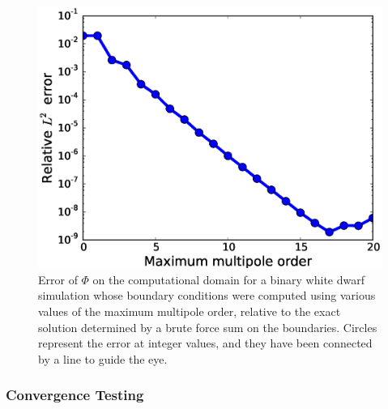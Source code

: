 \documentclass[12pt]{article}
\begin{document}
\begin{figure}[h!]
  \centering
  \includegraphics[scale=0.875]{plots/bc_comparison}
  \caption[Error in potential from multipole boundary conditions]
          {Error of $\Phi$ on the computational domain for a binary white dwarf simulation
           whose boundary conditions were computed using various values of the maximum multipole order,
           relative to the exact solution determined by a brute force sum on the boundaries.
           Circles represent the error at integer values, and they have been connected by a
           line to guide the eye.\label{fig:bc_comparison}}
\end{figure}

\clearpage
\subsubsection{Convergence Testing}\label{sec:gravity_convergence_testing}
\end{document}
